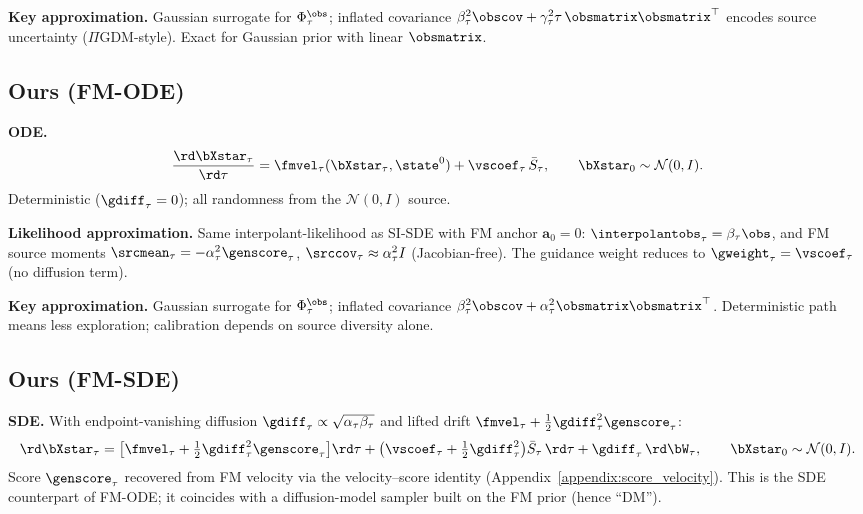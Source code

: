 \textbf{Key approximation.}
Gaussian surrogate for $\Phi_\tau^{\obs}$; inflated covariance $\beta_\tau^2\obscov+\gamma_\tau^2\tau\,\obsmatrix\obsmatrix^\top$ encodes source uncertainty ($\Pi$GDM-style). Exact for Gaussian prior with linear $\obsmatrix$.

\subsection{Ours (FM-ODE)}\label{appendix:method:fm_ode}

\textbf{ODE.}
\begin{align}
  \frac{\rd\bXstar_\tau}{\rd\tau}
  = \fmvel_\tau(\bXstar_\tau,\state^0)
  + \vscoef_\tau\,\bar{S}_\tau,
  \qquad \bXstar_0\sim\mathcal{N}(0,I).
\end{align}
Deterministic ($\gdiff_\tau=0$); all randomness from the $\mathcal{N}(0,I)$ source.

\textbf{Likelihood approximation.}
Same interpolant-likelihood as SI-SDE with FM anchor $\bm a_0=0$:
$\interpolantobs_\tau = \beta_\tau\obs$, and FM source moments $\srcmean_\tau=-\alpha_\tau^2\genscore_\tau$,
$\srccov_\tau\approx\alpha_\tau^2 I$ (Jacobian-free). The guidance weight reduces to $\gweight_\tau=\vscoef_\tau$ (no diffusion term).

\textbf{Key approximation.}
Gaussian surrogate for $\Phi_\tau^{\obs}$; inflated covariance $\beta_\tau^2\obscov+\alpha_\tau^2\obsmatrix\obsmatrix^\top$.
Deterministic path means less exploration; calibration depends on source diversity alone.

\subsection{Ours (FM-SDE)}\label{appendix:method:fm_sde}

\textbf{SDE.}
With endpoint-vanishing diffusion $\gdiff_\tau\propto\sqrt{\alpha_\tau\beta_\tau}$ and lifted drift $\fmvel_\tau+\tfrac12\gdiff_\tau^2\genscore_\tau$:
\begin{align}
  \rd\bXstar_\tau
  = \bigl[\fmvel_\tau + \tfrac12\gdiff_\tau^2\genscore_\tau\bigr]\rd\tau
  + \bigl(\vscoef_\tau + \tfrac12\gdiff_\tau^2\bigr)\bar{S}_\tau\,\rd\tau
  + \gdiff_\tau\,\rd\bW_\tau,
  \qquad \bXstar_0\sim\mathcal{N}(0,I).
\end{align}
Score $\genscore_\tau$ recovered from FM velocity via the velocity--score identity (Appendix~\ref{appendix:score_velocity}).
This is the SDE counterpart of FM-ODE; it coincides with a diffusion-model sampler built on the FM prior (hence ``DM'').

